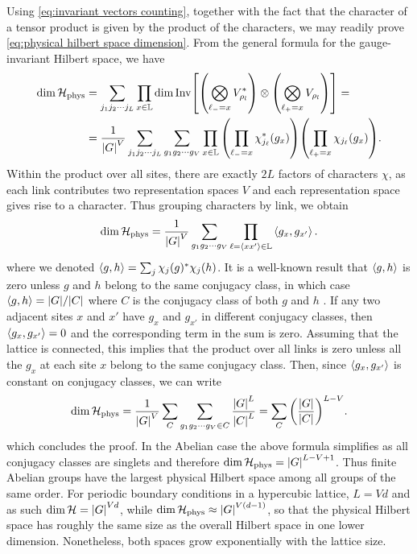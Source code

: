 Using \eqref{eq:invariant vectors counting}, together with the fact that the character of a tensor product is given by the product of the characters, we may readily prove \eqref{eq:physical hilbert space dimension}. From the general formula for the gauge-invariant Hilbert space, we have
\begin{align}
    \dim{\HilbertPhys} &=\sum_{j_1 j_2 \cdots j_L} \prod_{x \in \Lattice} \dim\mathrm{Inv}\bqty{\pqty{\bigotimes_{\link_{-} = x}  V_{\rho_l}^*} \otimes \pqty{\bigotimes_{\link_{+} = x}  V_{\rho_l}}} = \nonumber \\
    &=\frac{1}{\abs{G}^V}\sum_{j_1 j_2 \cdots j_L} \sum_{g_1 g_2 \cdots g_V} \prod_{x \in \Lattice} \pqty{\prod_{\link_{-} = x}  \chi_{j_{\link}}^*(g_x)}  \pqty{\prod_{\link_{+} = x} \chi_{j_{\link}}(g_x)} \nonumber.
\end{align}
Within the product over all sites, there are exactly $2L$ factors of characters $\chi$, as each link contributes two representation spaces $V$ and each representation space gives rise to a character. Thus grouping characters by link, we obtain
\begin{equation}
    \dim{\mathcal{H}_{\text{phys}}} =\frac{1}{\abs{G}^V} \sum_{g_1 g_2 \cdots g_V} \prod_{\ell = \expval{xx'} \in \mathbb{L}} \expval{g_x, g_{x'}}.
\end{equation}
where we denoted $\expval{g, h} = \sum_j \chi_j(g)^* \chi_j(h)$. It is a well-known result that $\expval{g, h}$ is zero unless $g$ and $h$ belong to the same conjugacy class, in which case $\expval{g, h} = \abs{G} / \abs{C}$ where $C$ is the conjugacy class of both $g$ and $h$ \cite{serre1967representations}. If any two adjacent sites $x$ and $x'$ have $g_x$ and $g_{x'}$ in different conjugacy classes, then $\expval{g_x, g_{x'}}=0$ and the corresponding term in the sum is zero. Assuming that the lattice is connected, this implies that the product over all links is zero unless all the $g_x$ at each site $x$ belong to the same conjugacy class. Then, since $\expval{g_x, g_{x'}}$ is constant on conjugacy classes, we can write
\begin{equation}
    \dim{\HilbertPhys}
    =\frac{1}{\abs{G}^V} \sum_C \sum_{g_1 g_2 \cdots g_V \in C} \frac{\abs{G}^L}{\abs{C}^L} = \sum_C  \pqty{\frac{\abs{G}}{\abs{C}}}^{L-V}.
\end{equation}
which concludes the proof.
In the Abelian case the above formula simplifies as all conjugacy classes are singlets and therefore $\dim{\mathcal{H}_{\text{phys}}} = \abs{G}^{L-V+1}$.
Thus finite Abelian groups have the largest physical Hilbert space among all groups of the same order.
For periodic boundary conditions in a hypercubic lattice, $L=Vd$ and as such $\dim{\mathcal{H}}=\abs{G}^{Vd}$, while $\dim{\mathcal{H}_{\text{phys}}} \approx \abs{G}^{V (d-1)}$, so that the physical Hilbert space has roughly the same size as the overall Hilbert space in one lower dimension.
Nonetheless, both spaces grow exponentially with the lattice size.

